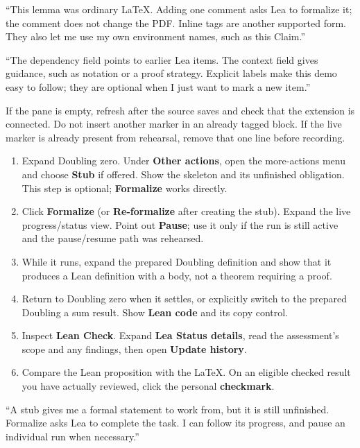 ``This lemma was ordinary LaTeX. Adding one comment asks Lea to formalize it;
the comment does not change the PDF. Inline tags are another supported form.
They also let me use my own environment names, such as this Claim.''

``The dependency field points to earlier Lea items. The context field gives
guidance, such as notation or a proof strategy. Explicit labels make this demo
easy to follow; they are optional when I just want to mark a new item.''

\fallback
If the pane is empty, refresh after the source saves and check that the extension
is connected. Do not insert another marker in an already tagged block. If the live
marker is already present from rehearsal, remove that one line before recording.

\clearpage
{}

\click
\begin{enumerate}
  \item Expand Doubling zero. Under \textbf{Other actions}, open the more-actions
    menu and choose \textbf{Stub} if offered. Show the skeleton and its unfinished
    obligation. This step is optional; \textbf{Formalize} works directly.
  \item Click \textbf{Formalize} (or \textbf{Re-formalize} after creating the stub).
    Expand the live progress/status view. Point out \textbf{Pause}; use it only if
    the run is still active and the pause/resume path was rehearsed.
  \item While it runs, expand the prepared Doubling definition and show that it
    produces a Lean definition with a body, not a theorem requiring a proof.
  \item Return to Doubling zero when it settles, or explicitly switch to the
    prepared Doubling a sum result. Show \textbf{Lean code} and its copy control.
  \item Inspect \textbf{Lean Check}. Expand \textbf{Lea Status details}, read the
    assessment's scope and any findings, then open \textbf{Update history}.
  \item Compare the Lean proposition with the LaTeX. On an eligible checked
    result you have actually reviewed, click the personal \textbf{checkmark}.
\end{enumerate}

\say
``A stub gives me a formal statement to work from, but it is still unfinished.
Formalize asks Lea to complete the task. I can follow its progress, and pause
an individual run when necessary.''

